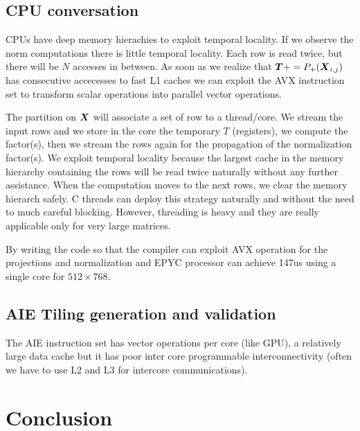 \documentclass[acmsmall]{acmart}
\begin{document}
\subsection{CPU conversation}
CPUs have deep memory hierachies to exploit temporal locality. If we
observe the norm computations there is little temporal locality. Each
row is read twice, but there will be $N$ accesses in between. As soon
as we realize that ${\boldsymbol T} += P_+({\boldsymbol X}_{i,j})$ has consecutive
accecesses to fast L1 caches we can exploit the AVX instruction set to
transform scalar operations into parallel vector operations.

The partition on ${\boldsymbol X}$ will associate a set of row to a
thread/core. We stream the input rows and we store in the core the
temporary $T$ (registers), we compute the factor(s), then we stream
the rows again for the propagation of the normalization factor(s). We
exploit temporal locality because the largest cache in the memory
hierarchy containing the rows will be read twice naturally without any
further assistance. When the computation moves to the next rows, we
clear the memory hierarch safely. C threads can deploy this strategy
naturally and without the need to much careful blocking. However,
threading is heavy and they are really applicable only for very large
matrices.

By writing the code so that the compiler can exploit AVX operation for
the projections and normalization and EPYC processor can achieve 147us
using a single core for $512 \times 768$.


\subsection{AIE Tiling generation and validation}
The AIE instruction set has vector operations per core (like GPU), a
relatively large data cache but it has poor inter core programmable
interconnectivity (often we have to use L2 and L3 for intercore communications).























\section{Conclusion}


  







%

 

%
\end{document}
